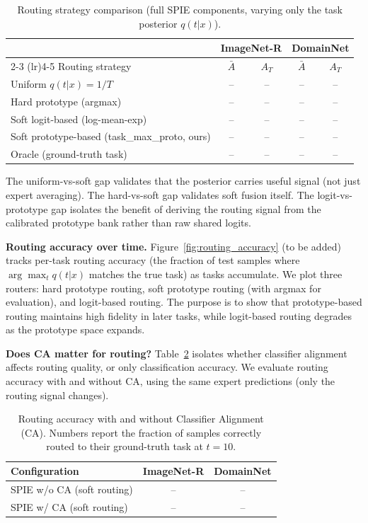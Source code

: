 \begin{table}[t]
\centering
\caption{Routing strategy comparison (full SPIE components, varying only the task posterior $q(t|x)$).}
\label{tab:routing_strategy}
\small
\begin{tabular}{lcccc}
\toprule
& \multicolumn{2}{c}{ImageNet-R} & \multicolumn{2}{c}{DomainNet} \\
\cmidrule(lr){2-3} \cmidrule(lr){4-5}
Routing strategy & $\bar{A}$ & $A_T$ & $\bar{A}$ & $A_T$ \\
\midrule
Uniform $q(t|x) = 1/T$            & -- & -- & -- & -- \\
Hard prototype (argmax)           & -- & -- & -- & -- \\
Soft logit-based (log-mean-exp)   & -- & -- & -- & -- \\
Soft prototype-based (task\_max\_proto, ours) & -- & -- & -- & -- \\
Oracle (ground-truth task)        & -- & -- & -- & -- \\
\bottomrule
\end{tabular}
\end{table}

The uniform-vs-soft gap validates that the posterior carries useful signal (not just expert averaging). The hard-vs-soft gap validates soft fusion itself. The logit-vs-prototype gap isolates the benefit of deriving the routing signal from the calibrated prototype bank rather than raw shared logits.

\textbf{Routing accuracy over time.}
Figure~\ref{fig:routing_accuracy} (to be added) tracks per-task routing accuracy (the fraction of test samples where $\arg\max_t q(t|x)$ matches the true task) as tasks accumulate. We plot three routers: hard prototype routing, soft prototype routing (with argmax for evaluation), and logit-based routing. The purpose is to show that prototype-based routing maintains high fidelity in later tasks, while logit-based routing degrades as the prototype space expands.

\textbf{Does CA matter for routing?}
Table~\ref{tab:ca_routing} isolates whether classifier alignment affects routing quality, or only classification accuracy. We evaluate routing accuracy with and without CA, using the same expert predictions (only the routing signal changes).

\begin{table}[h]
\centering
\caption{Routing accuracy with and without Classifier Alignment (CA). Numbers report the fraction of samples correctly routed to their ground-truth task at $t=10$.}
\label{tab:ca_routing}
\small
\begin{tabular}{lcc}
\toprule
Configuration & ImageNet-R & DomainNet \\
\midrule
SPIE w/o CA (soft routing) & -- & -- \\
SPIE w/ CA (soft routing)  & -- & -- \\
\bottomrule
\end{tabular}
\end{table}

